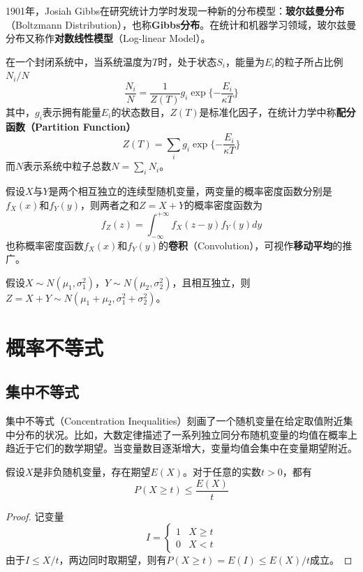 1901年，Josiah Gibbs在研究统计力学时发现一种新的分布模型：\textbf{玻尔兹曼分布}（Boltzmann Distribution），也称\textbf{Gibbs分布}。在统计和机器学习领域，玻尔兹曼分布又称作\textbf{对数线性模型}（Log-linear Model）。
\begin{definition}[玻尔兹曼分布]
在一个封闭系统中，当系统温度为$T$时，处于状态$S_i$，能量为$E_i$的粒子所占比例$N_i/N$
\begin{equation}
    \frac{N_i}{N} = \frac{1}{Z(T)} g_i \exp\{-\frac{E_i}{\kappa T}\}
\end{equation}
其中，$g_i$表示拥有能量$E_i$的状态数目，$Z(T)$是标准化因子，在统计力学中称\textbf{配分函数（Partition Function）}
\begin{equation}
    Z(T) = \sum\limits_i g_i \exp\{-\frac{E_i}{\kappa T}\}
\end{equation}
而$N$表示系统中粒子总数$N=\sum\limits_i N_i$。
\end{definition}

\begin{theorem}[卷积公式]
假设$X$与$Y$是两个相互独立的连续型随机变量，两变量的概率密度函数分别是$f_X(x)$和$f_Y(y)$，则两者之和$Z=X+Y$的概率密度函数为
\begin{equation}
    f_Z(z) = \int_{-\infty}^{+\infty} f_X(z-y) f_Y(y) dy
\end{equation}
也称概率密度函数$f_X(x)$和$f_Y(y)$的\textbf{卷积}（Convolution），可视作\textbf{移动平均}的推广。
\end{theorem}

\begin{theorem}[正态分布的可加性]
假设$X\sim N(\mu_1,\sigma_1^2)$，$Y\sim N(\mu_2,\sigma_2^2)$，且相互独立，则$Z=X+Y\sim N(\mu_1+\mu_2,\sigma_1^2 +\sigma_2^2)$。
\end{theorem}

\section{概率不等式}%
\subsection{集中不等式}
集中不等式（Concentration Inequalities）刻画了一个随机变量在给定取值附近集中分布的状况。比如，大数定律描述了一系列独立同分布随机变量的均值在概率上趋近于它们的数学期望。当变量数目逐渐增大，变量均值会集中在变量期望附近。

\begin{theorem}[Markov不等式]
假设$X$是非负随机变量，存在期望$E(X)$。对于任意的实数$t>0$，都有
\begin{equation}
    P(X\ge t) \le \frac{E(X)}{t}
\end{equation}
\end{theorem}
\begin{proof}
记变量
\begin{equation}
    I = \left\{
        \begin{array}{ll}
          1 & X\ge t \\
          0 & X < t
        \end{array}
    \right.
\end{equation}
由于$I\le X/t$，两边同时取期望，则有$P(X\ge t)=E(I) \le E(X)/t$成立。
\end{proof}

